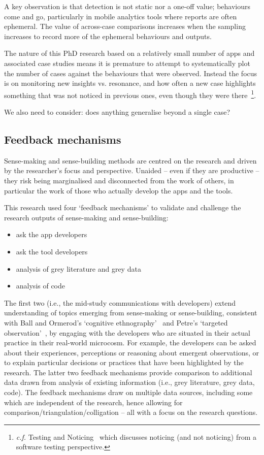 A key observation is that detection is not static nor a one-off value; behaviours come and go, particularly in mobile analytics tools where reports are often ephemeral. The value of across-case comparisons increases when the sampling increases to record more of the ephemeral behaviours and outputs.

The nature of this PhD research based on a relatively small number of apps and associated case studies means it is premature to attempt to systematically plot the number of cases against the behaviours that were observed. Instead the focus is on monitoring 
new insights vs. resonance, and how often a new case highlights something that was not noticed in previous ones, even though they were there~\footnote{\textit{c.f.} Testing and Noticing~\citep{bolton2009_testing_and_noticing} which discusses noticing (and not noticing) from a software testing perspective.}.

We also need to consider: does anything generalise beyond a single case?   


\subsection{Feedback mechanisms}
Sense-making and sense-building methods are centred on the research and driven by the researcher's focus and perspective. Unaided -- even if they are productive -- they risk being marginalised and disconnected from the work of others, in particular the work of those who actually develop the apps and the tools. 

This research used four `feedback mechanisms' to validate and challenge the research outputs of sense-making and sense-building:
\begin{itemize}
\itemsep0em
\item ask the app developers
\item ask the tool developers
\item analysis of grey literature and grey data
\item analysis of code
\end{itemize}
The first two (i.e., the mid-study communications with developers) extend understanding of topics emerging from sense-making or sense-building, consistent with Ball and Ormerod's `cognitive ethnography'~\citep{ball2000_putting_ethnography_to_work_cognitive_ethnography} and Petre's `targeted observation'~\citep[p.234]{petre2009_insights_from_expert_software_design_practice}, by engaging with the developers who are situated in their actual practice in their real-world microcosm.  For example, the developers can be asked about their experiences, perceptions or reasoning about emergent observations, or to explain particular decisions or practices that have been highlighted by the research. The latter two feedback mechanisms provide comparison to additional data drawn from analysis of existing information (i.e., grey literature, grey data, code).  The feedback mechanisms draw on multiple data sources, including some which are independent of the research, hence allowing for comparison/triangulation/colligation -- all with a focus on the research questions.


